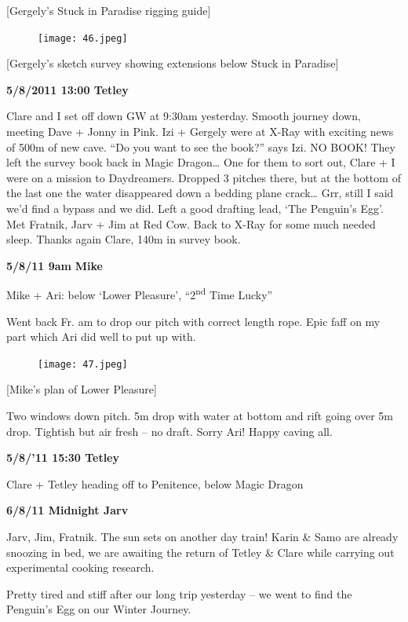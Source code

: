 {[}Gergely's Stuck in Paradise rigging guide{]}

\begin{figure}[htbp]
\centering
\texttt{[image: 46.jpeg]}
\caption{}
\end{figure}

{[}Gergely's sketch survey showing extensions below Stuck in Paradise{]}

\textbf{5/8/2011 13:00 Tetley}

Clare and I set off down GW at 9:30am yesterday. Smooth journey down,
meeting Dave + Jonny in Pink. Izi + Gergely were at X-Ray with exciting
news of 500m of new cave. ``Do you want to see the book?'' says Izi. NO
BOOK! They left the survey book back in Magic Dragon\ldots{} One for
them to sort out, Clare + I were on a mission to Daydreamers. Dropped 3
pitches there, but at the bottom of the last one the water disappeared
down a bedding plane crack\ldots{} Grr, still I said we'd find a bypass
and we did. Left a good drafting lead, `The Penguin's Egg'. Met Fratnik,
Jarv + Jim at Red Cow. Back to X-Ray for some much needed sleep. Thanks
again Clare, 140m in survey book.

\textbf{5/8/11 9am} \textbf{Mike}

Mike + Ari: below `Lower Pleasure', ``2\textsuperscript{nd} Time Lucky''

Went back Fr. am to drop our pitch with correct length rope. Epic faff
on my part which Ari did well to put up with.

\begin{figure}[htbp]
\centering
\texttt{[image: 47.jpeg]}
\caption{}
\end{figure}

{[}Mike's plan of Lower Pleasure{]}

Two windows down pitch. 5m drop with water at bottom and rift going over
5m drop. Tightish but air fresh -- no draft. Sorry Ari! Happy caving
all.

\textbf{5/8/'11 15:30 Tetley}

Clare + Tetley heading off to Penitence, below Magic Dragon

\textbf{6/8/11 Midnight Jarv}

Jarv, Jim, Fratnik. The sun sets on another day train! Karin \& Samo are
already snoozing in bed, we are awaiting the return of Tetley \& Clare
while carrying out experimental cooking research.

Pretty tired and stiff after our long trip yesterday -- we went to find
the Penguin's Egg on our Winter Journey.

